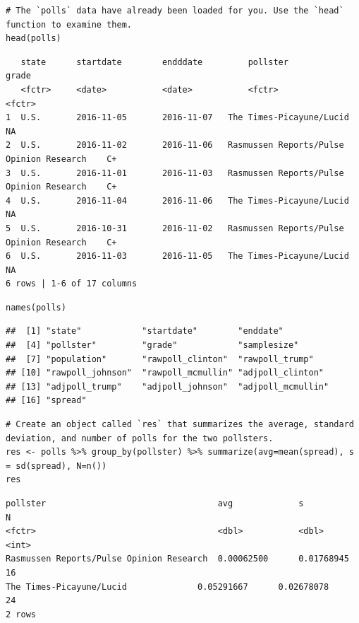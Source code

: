 \documentclass[
]{article}
\begin{document}
\begin{verbatim}
# The `polls` data have already been loaded for you. Use the `head` function to examine them.
head(polls)
\end{verbatim}

\begin{verbatim}
   state      startdate        endddate         pollster                                        grade     
   <fctr>     <date>           <date>           <fctr>                                          <fctr>
1  U.S.       2016-11-05       2016-11-07   The Times-Picayune/Lucid                    NA  
2  U.S.       2016-11-02       2016-11-06   Rasmussen Reports/Pulse Opinion Research    C+  
3  U.S.       2016-11-01       2016-11-03   Rasmussen Reports/Pulse Opinion Research    C+  
4  U.S.       2016-11-04       2016-11-06   The Times-Picayune/Lucid                    NA  
5  U.S.       2016-10-31       2016-11-02   Rasmussen Reports/Pulse Opinion Research    C+  
6  U.S.       2016-11-03       2016-11-05   The Times-Picayune/Lucid                    NA  
6 rows | 1-6 of 17 columns
\end{verbatim}

\begin{verbatim}
names(polls)
\end{verbatim}

\begin{verbatim}
##  [1] "state"            "startdate"        "enddate"         
##  [4] "pollster"         "grade"            "samplesize"      
##  [7] "population"       "rawpoll_clinton"  "rawpoll_trump"   
## [10] "rawpoll_johnson"  "rawpoll_mcmullin" "adjpoll_clinton" 
## [13] "adjpoll_trump"    "adjpoll_johnson"  "adjpoll_mcmullin"
## [16] "spread"
\end{verbatim}

\begin{verbatim}
# Create an object called `res` that summarizes the average, standard deviation, and number of polls for the two pollsters.
res <- polls %>% group_by(pollster) %>% summarize(avg=mean(spread), s = sd(spread), N=n())
res
\end{verbatim}

\begin{verbatim}
pollster                                  avg             s               N
<fctr>                                    <dbl>           <dbl>           <int>
Rasmussen Reports/Pulse Opinion Research  0.00062500      0.01768945      16
The Times-Picayune/Lucid              0.05291667      0.02678078      24
2 rows
\end{verbatim}
\end{document}
